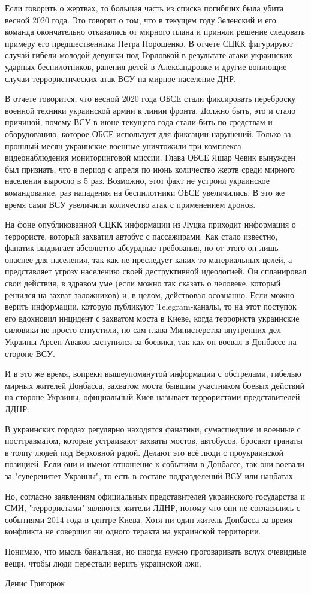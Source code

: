 Если говорить о жертвах, то большая часть из списка погибших была убита весной
2020 года. Это говорит о том, что в текущем году Зеленский и его команда
окончательно отказались от мирного плана и приняли решение следовать примеру
его предшественника Петра Порошенко. В отчете СЦКК фигурируют случай гибели
молодой девушки под Горловкой в результате атаки украинских ударных
беспилотников, ранения детей в Александровке и другие вопиющие случаи
террористических атак ВСУ на мирное население ДНР.

В отчете говорится, что весной 2020 года ОБСЕ стали фиксировать переброску
военной техники украинской армии к линии фронта. Должно быть, это и стало
причиной, почему ВСУ в июне текущего года стали бить по средствам и
оборудованию, которое ОБСЕ использует для фиксации нарушений. Только за прошлый
месяц украинские военные уничтожили три комплекса видеонаблюдения
мониторинговой миссии. Глава ОБСЕ Яшар Чевик вынужден был признать, что в
период с апреля по июнь количество жертв среди мирного населения выросло в 5
раз. Возможно, этот факт не устроил украинское командование, раз нападения на
беспилотники ОБСЕ увеличились. В это же время сами ВСУ увеличили количество
атак с применением дронов.

На фоне опубликованной СЦКК информации из Луцка приходит информация о
террористе, который захватил автобус с пассажирами. Как стало известно, фанатик
выдвигает абсолютно абсурдные требования, но от этого он лишь опаснее для
населения, так как не преследует каких-то материальных целей, а представляет
угрозу населению своей деструктивной идеологией. Он спланировал свои действия,
в здравом уме (если можно так сказать о человеке, который решился на захват
заложников) и, в целом, действовал осознанно. Если можно верить информации,
которую публикуют Telegram-каналы, то на этот поступок его вдохновил инцидент с
захватом моста в Киеве, когда террориста украинские силовики не просто
отпустили, но сам глава Министерства внутренних дел Украины Арсен Аваков
заступился за боевика, так как он воевал в Донбассе на стороне ВСУ.

И в это же время, вопреки вышеупомянутой информации с обстрелами, гибелью
мирных жителей Донбасса, захватом моста бывшим участником боевых действий на
стороне Украины, официальный Киев называет террористами представителей ЛДНР.

В украинских городах регулярно находятся фанатики, сумасшедшие и военные с
посттравматом, которые устраивают захваты мостов, автобусов, бросают гранаты в
толпу людей под Верховной радой. Делают это всё люди с проукраинской позицией.
Если они и имеют отношение к событиям в Донбассе, так они воевали за
"суверенитет Украины", то есть в составе подразделений ВСУ или нацбатах.

Но, согласно заявлениям официальных представителей украинского государства и
СМИ, "террористами" являются жители ЛДНР, потому что они не согласились с
событиями 2014 года в центре Киева. Хотя ни один житель Донбасса за время
конфликта не совершил ни одного теракта на украинской территории.

Понимаю, что мысль банальная, но иногда нужно проговаривать вслух очевидные
вещи, чтобы люди перестали верить украинской лжи.

Денис Григорюк
  

